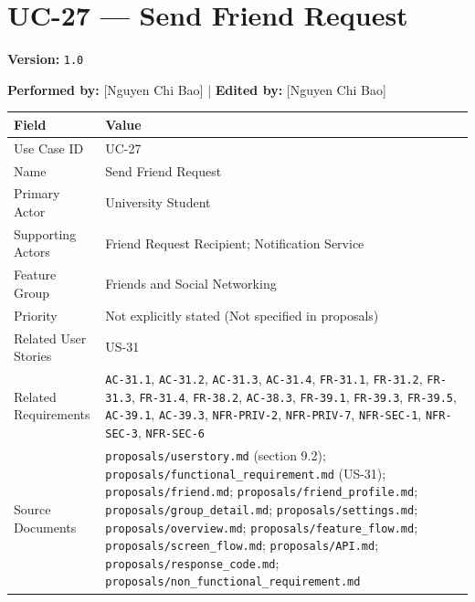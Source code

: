 \documentclass[12pt]{article}
\renewcommand{\baselinestretch}{1.5}
\begin{document}
\pagebreak
\hypertarget{sec:uc-27-send-friend-request}{}
\section*{UC-27 --- Send Friend Request}
\par\medskip

\textbf{Version:} \texttt{1.0}
\par\medskip

\textbf{Performed by:} [Nguyen Chi Bao] | \textbf{Edited by:} [Nguyen Chi Bao]
\par\medskip

\begingroup
\small
\renewcommand{\baselinestretch}{1.0}\selectfont
\renewcommand{\arraystretch}{1.15}
\setlength{\tabcolsep}{6pt}
\begin{longtable}{|>{\raggedright\arraybackslash}p{}|>{\raggedright\arraybackslash}p{}|}
\hline
\textbf{Field} & \textbf{Value} \\ \hline
\endhead
Use Case ID & UC-27 \\ \hline
Name & Send Friend Request \\ \hline
Primary Actor & University Student \\ \hline
Supporting Actors & Friend Request Recipient; Notification Service \\ \hline
Feature Group & Friends and Social Networking \\ \hline
Priority & Not explicitly stated (Not specified in proposals) \\ \hline
Related User Stories & US-31 \\ \hline
Related Requirements & \texttt{AC-31.1}, \texttt{AC-31.2}, \texttt{AC-31.3}, \texttt{AC-31.4}, \texttt{FR-31.1}, \texttt{FR-31.2}, \texttt{FR-31.3}, \texttt{FR-31.4}, \texttt{FR-38.2}, \texttt{AC-38.3}, \texttt{FR-39.1}, \texttt{FR-39.3}, \texttt{FR-39.5}, \texttt{AC-39.1}, \texttt{AC-39.3}, \texttt{NFR-PRIV-2}, \texttt{NFR-PRIV-7}, \texttt{NFR-SEC-1}, \texttt{NFR-SEC-3}, \texttt{NFR-SEC-6} \\ \hline
Source Documents & \texttt{proposals/userstory.md} (section 9.2); \texttt{proposals/functional\_requirement.md} (US-31); \texttt{proposals/friend.md}; \texttt{proposals/friend\_profile.md}; \texttt{proposals/group\_detail.md}; \texttt{proposals/settings.md}; \texttt{proposals/overview.md}; \texttt{proposals/feature\_flow.md}; \texttt{proposals/screen\_flow.md}; \texttt{proposals/API.md}; \texttt{proposals/response\_code.md}; \texttt{proposals/non\_functional\_requirement.md} \\ \hline
\end{longtable}
\endgroup
\par\medskip
\end{document}
